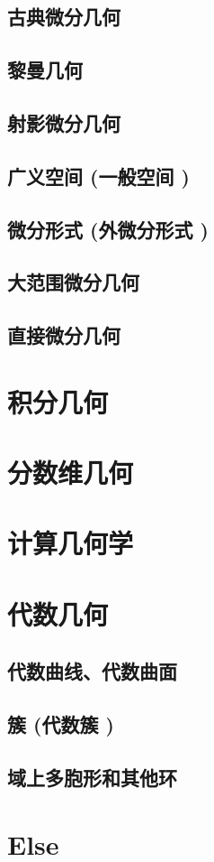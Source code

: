 \documentclass[UTF8]{../09-Mathematics}
\begin{document}
\section{古典微分几何}
\section{黎曼几何}
\section{射影微分几何}
\section{广义空间 (一般空间 )}
\section{微分形式 (外微分形式 )}
\section{大范围微分几何}
\section{直接微分几何}


\chapter{积分几何}


\chapter{分数维几何}
\chapter{计算几何学}


\chapter{代数几何}
    \section{代数曲线、代数曲面}
    \section{簇 (代数簇 )}
    \section{域上多胞形和其他环}


\chapter{Else}
\end{document}
